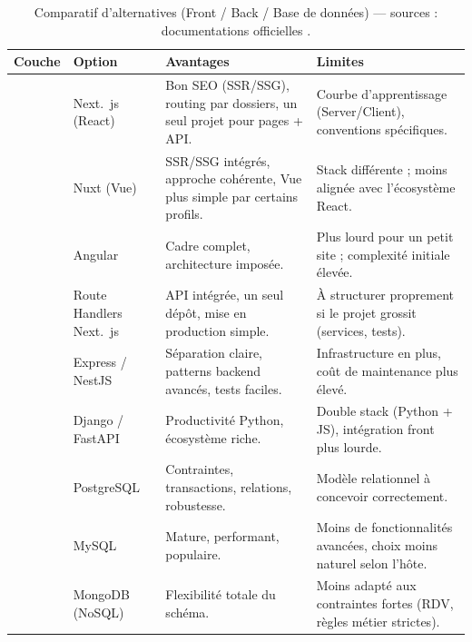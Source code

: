 \renewcommand{\arraystretch}{1.2}
\setlength{\tabcolsep}{6pt}
\begin{table}[H]
    \centering
    \small
    \caption{Comparatif d’alternatives (Front / Back / Base de données) — sources : documentations officielles \cite{reactDocs,nextjsDocs,vercelDocs,prismaDocs,neonDocs}.}
    \label{tab:tech_comparison}

\begin{tabularx}{\textwidth}{@{} >{\raggedright\arraybackslash}p{3.0cm} >{\raggedright\arraybackslash}p{4.0cm} X >{\raggedright\arraybackslash}p{4.0cm} @{}}
    \toprule
    \textbf{Couche} & \textbf{Option} & \textbf{Avantages} & \textbf{Limites} \\
    \midrule
    \multirow{8}{*}{\textbf{Frontend}} 
        & Next.~js (React) & Bon SEO (SSR/SSG), routing par dossiers, un seul projet pour pages + API. & Courbe d’apprentissage (Server/Client), conventions spécifiques. \\
        \cmidrule{2-4}
        & Nuxt (Vue) & SSR/SSG intégrés, approche cohérente, Vue plus simple par certains profils. & Stack différente ; moins alignée avec l’écosystème React. \\
        \cmidrule{2-4}
        & Angular & Cadre complet, architecture imposée. & Plus lourd pour un petit site ; complexité initiale élevée. \\
    \midrule
    \multirow{8}{*}{\textbf{Backend}} 
        & Route Handlers Next.~js & API intégrée, un seul dépôt, mise en production simple. & À structurer proprement si le projet grossit (services, tests). \\
        \cmidrule{2-4}
        & Express / NestJS & Séparation claire, patterns backend avancés, tests faciles. & Infrastructure en plus, coût de maintenance plus élevé. \\
        \cmidrule{2-4}
        & Django / FastAPI & Productivité Python, écosystème riche. & Double stack (Python + JS), intégration front plus lourde. \\
    \midrule
    \multirow{8}{*}{\textbf{Base de données}} 
        & PostgreSQL & Contraintes, transactions, relations, robustesse. & Modèle relationnel à concevoir correctement. \\
        \cmidrule{2-4}
        & MySQL & Mature, performant, populaire. & Moins de fonctionnalités avancées, choix moins naturel selon l'hôte. \\
        \cmidrule{2-4}
        & MongoDB (NoSQL) & Flexibilité totale du schéma. & Moins adapté aux contraintes fortes (RDV, règles métier strictes). \\
    \bottomrule
\end{tabularx}
\end{table}
\renewcommand{\arraystretch}{1.0}

